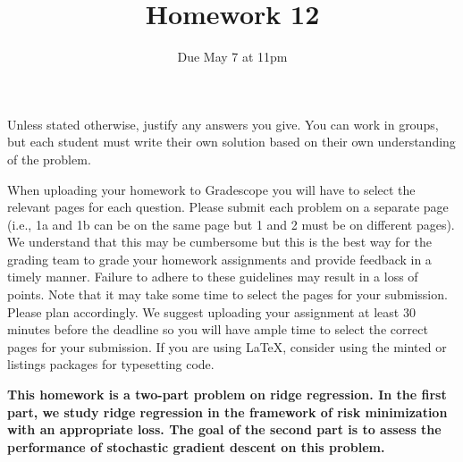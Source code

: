 \documentclass[12pt]{article}
\begin{document}
\title{\sc Homework 12}
\date{Due May 7 at 11pm} 
\author{}
\maketitle




\newtheorem*{problem}{Problem}
\newtheorem*{heuristic}{Heuristic}
\newtheorem*{conjecture}{Conjecture}
\newtheorem{theorem}{Theorem}[section]
\newtheorem{corollary}[theorem]{Corollary}
\newtheorem{prop}[theorem]{Proposition}
\newtheorem{lemma}[theorem]{Lemma}
\newtheorem{definition}[theorem]{Definition}
\theoremstyle{remark}
\newtheorem{example}[theorem]{Example}
\newtheorem{remark}[theorem]{Remark}
\newtheorem{exercise}[theorem]{Exercise}


Unless stated otherwise, justify any answers you give. You can work in groups, but each student
must write their own solution based on their own understanding of the problem.

When uploading your homework to Gradescope you will have to select the relevant pages
for each question. Please submit each problem on a separate page (i.e., 1a and 1b can be on
the same page but 1 and 2 must be on different pages). We understand that this may be
cumbersome but this is the best way for the grading team to grade your homework assignments and provide feedback in a timely manner. Failure to adhere to these guidelines may
result in a loss of points. Note that it may take some time to select the pages for your submission. Please plan accordingly. We suggest uploading your assignment at least 30 minutes
before the deadline so you will have ample time to select the correct pages for your submission. If you are using \LaTeX, consider using the minted or listings packages for typesetting code.

\medskip

\textbf{This homework is a two-part problem on ridge regression. In the first part, we study ridge regression in the framework of risk minimization with an appropriate loss. The goal of the second part is to assess the performance of stochastic gradient descent on this problem.}
\end{document}
